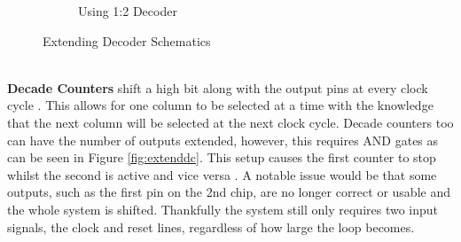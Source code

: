 \documentclass[12pt,a4paper]{report}
\begin{document}
\begin{figure}[h!]
\begin{subfigure}[b]{0.45\textwidth}
	\caption{Using 1:2 Decoder}	
\end{subfigure}
	\caption{Extending Decoder  Schematics \cite{extendDecoder}}
	\label{fig:decoderentend}
\end{figure}\\
\textbf{Decade Counters} shift a high bit along with the output pins at every clock cycle \cite{CountersAoE}. This allows for one column to be selected at a time with the knowledge that the next column will be selected at the next clock cycle. Decade counters too can have the number of outputs extended, however, this requires AND gates as can be seen in Figure \ref{fig:extenddc}. This setup causes the first counter to stop whilst the second is active and vice versa \cite{chainingCounters}. A notable issue would be that some outputs, such as the first pin on the 2nd chip, are no longer correct or usable and the whole system is shifted. Thankfully the system still only requires two input signals, the clock and reset lines, regardless of how large the loop becomes.
\end{document}
